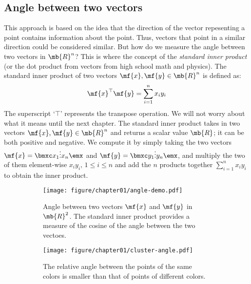 \subsection{Angle between two vectors}
This approach is based on the idea that the direction of the vector repesenting a point contains information about the point. Thus, vectors that point in a similar direction could be considered similar. But how do we measure the angle between two vectors in $\mb{R}^n$? This is where the concept of the \textit{standard inner product} (or the dot product from vectors from high school math and physics). The standard inner product of two vectors $\mf{x}, \mf{y} \in \mb{R}^n$ is defined as:
\[ \mf{x}^\top\mf{y} = \sum_{i=1}^{n} x_i y_i \]
The superscript `$\top$' represents the transpose operation. We will not worry about what it means until the next chapter. The standard inner product takes in two vectors $\mf{x}, \mf{y} \in \mb{R}^n$ and returns a scalar value $\mb{R}$; it can be both positive and negative. We compute it by simply taking the two vectors $\mf{x} = \bmxc x_1 \\ \vdots \\ x_n \emx$ and $\mf{y} = \bmxc y_1 \\ \vdots \\ y_n \emx$, and multiply the two of them element-wise $x_i y_i, \, 1 \leq i \leq n$ and add the $n$ products together $\sum_{i=1}^n x_i y_i$ to obtain the inner product.

\begin{figure}[h]
    \centering
    \begin{subfigure}[b]{0.45\textwidth}
        \texttt{[image: figure/chapter01/angle-demo.pdf]}
        \caption{Angle between two vectors $\mf{x}$ and $\mf{y}$ in $\mb{R}^2$. The standard inner product provides a measure of the cosine of the angle between the two vectoes.}
        \label{fig:ch01-angle1}
    \end{subfigure}
    \hspace{0.05\textwidth}
    \begin{subfigure}[b]{0.4\textwidth}
        \centering
        \texttt{[image: figure/chapter01/cluster-angle.pdf]}
        \caption{The relative angle between the points of the same colors is smaller than that of points of different colors.}
        \label{fig:ch01-angle-clusters}
    \end{subfigure}
    \caption{}
\end{figure}

